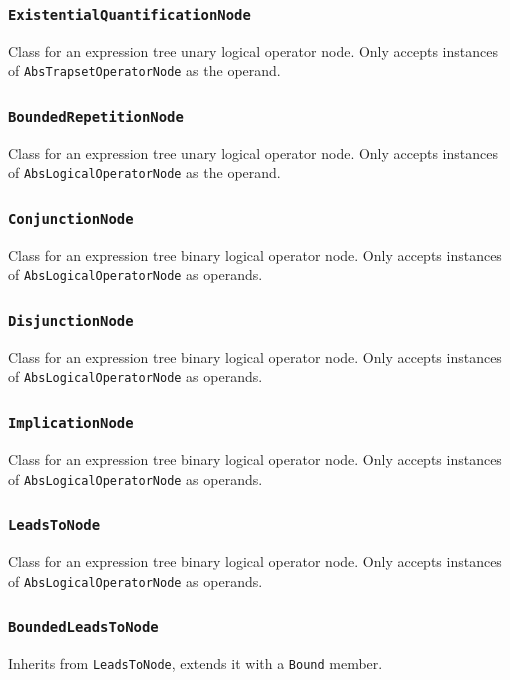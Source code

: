 \documentclass[12pt,oneside,a4paper,notitlepage]{report}
\begin{document}
	\subsubsection{\texttt{ExistentialQuantificationNode}}
	\par Class for an expression tree unary logical operator node. Only accepts instances of \texttt{AbsTrapsetOperatorNode} as the operand.

	\subsubsection{\texttt{BoundedRepetitionNode}}
	\par Class for an expression tree unary logical operator node. Only accepts instances of \texttt{AbsLogicalOperatorNode} as the operand.

	\subsubsection{\texttt{ConjunctionNode}}
	\par Class for an expression tree binary logical operator node. Only accepts instances of \texttt{AbsLogicalOperatorNode} as operands.

	\subsubsection{\texttt{DisjunctionNode}}
	\par Class for an expression tree binary logical operator node. Only accepts instances of \texttt{AbsLogicalOperatorNode} as operands.

	\subsubsection{\texttt{ImplicationNode}}
	\par Class for an expression tree binary logical operator node. Only accepts instances of \texttt{AbsLogicalOperatorNode} as operands.

	\subsubsection{\texttt{LeadsToNode}}
	\par Class for an expression tree binary logical operator node. Only accepts instances of \texttt{AbsLogicalOperatorNode} as operands.

	\subsubsection{\texttt{BoundedLeadsToNode}}
	\par Inherits from \texttt{LeadsToNode}, extends it with a \texttt{Bound} member.
\end{document}
